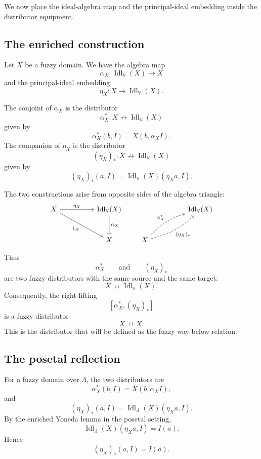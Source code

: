 We now place the ideal-algebra map and the principal-ideal embedding inside the
distributor equipment.

\subsection{The enriched construction}
\label{subsec:ideal-algebra-map-equipment-enriched}

Let \(X\) be a fuzzy domain. We have the algebra map
\[
    \alpha_X:\operatorname{Idl}_{\mathbb V}(X)\to X
\]
and the principal-ideal embedding
\[
    \eta_X:X\to\operatorname{Idl}_{\mathbb V}(X).
\]

The conjoint of \(\alpha_X\) is the distributor
\[
    \alpha_X^\ast:
    X\nrightarrow \operatorname{Idl}_{\mathbb V}(X)
\]
given by
\[
    \alpha_X^\ast(b,I)
    =
    X(b,\alpha_X I).
\]
The companion of \(\eta_X\) is the distributor
\[
    (\eta_X)_\ast:
    X\nrightarrow \operatorname{Idl}_{\mathbb V}(X)
\]
given by
\[
    (\eta_X)_\ast(a,I)
    =
    \operatorname{Idl}_{\mathbb V}(X)(\eta_X a,I).
\]

The two constructions arise from opposite sides of the algebra triangle:
\[
\begin{tikzcd}[column sep=huge,row sep=large]
X
    \ar[r,"\eta_X"]
    \ar[dr,"1_X"']
&
\operatorname{Idl}_{\mathbb V}(X)
    \ar[d,"\alpha_X"]
\\
&
X
\end{tikzcd}
\qquad
\begin{tikzcd}[column sep=huge,row sep=large]
&
\operatorname{Idl}_{\mathbb V}(X)
\\
X
    \ar[ur,dashed,bend left=14,"\alpha_X^\ast"]
    \ar[ur,dashed,bend right=14,"{(\eta_X)_\ast}"']
\end{tikzcd}
\]

Thus
\[
    \alpha_X^\ast
    \qquad\text{and}\qquad
    (\eta_X)_\ast
\]
are two fuzzy distributors with the same source and the same target:
\[
    X\nrightarrow \operatorname{Idl}_{\mathbb V}(X).
\]
Consequently, the right lifting
\[
    [\alpha_X^\ast,(\eta_X)_\ast]
\]
is a fuzzy distributor
\[
    X\nrightarrow X.
\]
This is the distributor that will be defined as the fuzzy way-below relation.

\subsection{The posetal reflection}
\label{subsec:ideal-algebra-map-equipment-posetal}

For a fuzzy domain over \(\Lambda\), the two distributors are
\[
    \alpha_X^\ast(b,I)
    =
    X(b,\alpha_X I),
\]
and
\[
    (\eta_X)_\ast(a,I)
    =
    \operatorname{Idl}_\Lambda(X)(\eta_X a,I).
\]
By the enriched Yoneda lemma in the posetal setting,
\[
    \operatorname{Idl}_\Lambda(X)(\eta_X a,I)
    =
    I(a).
\]
Hence
\[
    (\eta_X)_\ast(a,I)=I(a).
\]

